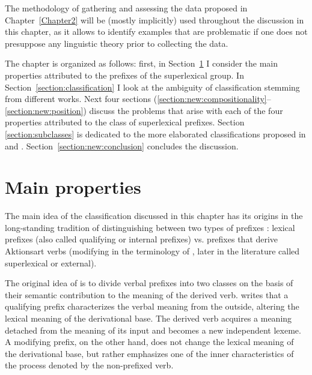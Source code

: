  The methodology of gathering and assessing the data proposed in Chapter~\ref{Chapter2} will be (mostly implicitly) used throughout the discussion in this chapter, as it allows to identify examples that are problematic if one does not presuppose any linguistic theory prior to collecting the data.

The chapter is organized as follows: first, in Section~\ref{section:properties} I consider the main properties attributed to the prefixes of the superlexical group. In Section~\ref{section:classification} I look at the ambiguity of classification stemming from different works. Next four sections (\ref{section:new:compositionality}--\ref{section:new:position}) discuss the problems that arise with each of the four properties attributed to the class of superlexical prefixes. Section \ref{section:subclasses} is dedicated to the more elaborated classifications proposed in \citet{Tatevosov:07} and \citet{Tatevosov:09}. Section~\ref{section:new:conclusion} concludes the discussion.
\section{Main properties}\label{section:properties}
The main idea of the classification discussed in this chapter has its origins in the long-standing tradition of distinguishing between two types of prefixes \citep{Isachenko:60, Forsyth:70, Townsend:75}: lexical prefixes (also called qualifying or internal prefixes) vs. prefixes that derive Aktionsart verbs (modifying in the terminology of \citeauthor{Isachenko:60}, later in the literature called superlexical or external).

The original idea of \citet[222--224]{Isachenko:60} is to divide verbal prefixes into two classes on the basis of their semantic contribution to the meaning of the derived verb. \citeauthor{Isachenko:60} writes that a qualifying prefix characterizes the verbal meaning from the outside, altering the lexical meaning of the derivational base. The derived verb acquires a meaning detached from the meaning of its input and becomes a new independent lexeme. A modifying prefix, on the other hand, does not change the lexical meaning of the derivational base, but rather emphasizes one of the inner characteristics of the process denoted by the non-prefixed verb.

